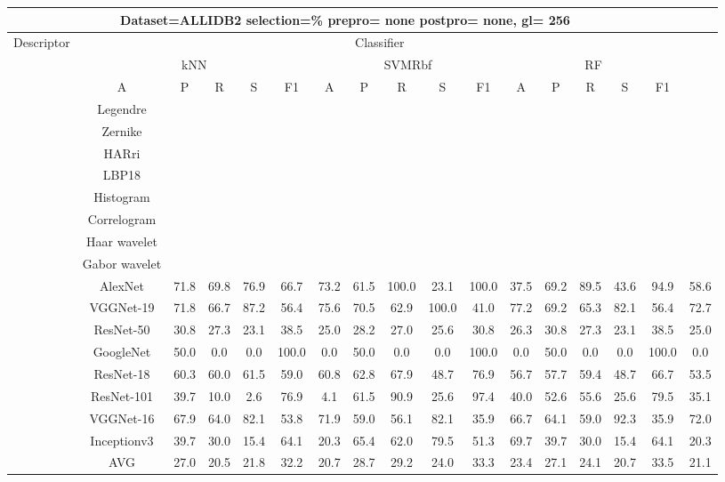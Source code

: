 \documentclass[12pt,italian]{article}
\begin{document}
\begin{tiny}
 \pagebreak 
\begin{longtable}{lcccccccccccccccc}
\toprule
\multicolumn{16}{c}{Dataset=ALLIDB2 selection=\% prepro= none postpro= none, gl= 256} \\ 
\toprule
Descriptor & \multicolumn{15}{c}{Classifier} \\ 
& \multicolumn{5}{c}{kNN} & \multicolumn{5}{c}{SVMRbf} & \multicolumn{5}{c}{RF} \\ 
& A & P & R & S & F1 & A & P & R & S & F1 & A & P & R & S & F1 \\ 
\midrule
& Legendre \\ 
& Zernike \\ 
& HARri \\ 
& LBP18 \\ 
& Histogram \\ 
& Correlogram \\ 
& Haar wavelet \\ 
& Gabor wavelet \\ 
& AlexNet & 71.8 & 69.8 & 76.9 & 66.7 & 73.2 & 61.5 & 100.0 & 23.1 & 100.0 & 37.5 & 69.2 & 89.5 & 43.6 & 94.9 & 58.6 \\ 
& VGGNet-19 & 71.8 & 66.7 & 87.2 & 56.4 & 75.6 & 70.5 & 62.9 & 100.0 & 41.0 & 77.2 & 69.2 & 65.3 & 82.1 & 56.4 & 72.7 \\ 
& ResNet-50 & 30.8 & 27.3 & 23.1 & 38.5 & 25.0 & 28.2 & 27.0 & 25.6 & 30.8 & 26.3 & 30.8 & 27.3 & 23.1 & 38.5 & 25.0 \\ 
& GoogleNet & 50.0 &  0.0 &  0.0 & 100.0 &  0.0 & 50.0 &  0.0 &  0.0 & 100.0 &  0.0 & 50.0 &  0.0 &  0.0 & 100.0 &  0.0 \\ 
& ResNet-18 & 60.3 & 60.0 & 61.5 & 59.0 & 60.8 & 62.8 & 67.9 & 48.7 & 76.9 & 56.7 & 57.7 & 59.4 & 48.7 & 66.7 & 53.5 \\ 
& ResNet-101 & 39.7 & 10.0 &  2.6 & 76.9 &  4.1 & 61.5 & 90.9 & 25.6 & 97.4 & 40.0 & 52.6 & 55.6 & 25.6 & 79.5 & 35.1 \\ 
& VGGNet-16 & 67.9 & 64.0 & 82.1 & 53.8 & 71.9 & 59.0 & 56.1 & 82.1 & 35.9 & 66.7 & 64.1 & 59.0 & 92.3 & 35.9 & 72.0 \\ 
& Inceptionv3 & 39.7 & 30.0 & 15.4 & 64.1 & 20.3 & 65.4 & 62.0 & 79.5 & 51.3 & 69.7 & 39.7 & 30.0 & 15.4 & 64.1 & 20.3 \\ 
\hline
& AVG & 27.0 & 20.5 & 21.8 & 32.2 & 20.7 & 28.7 & 29.2 & 24.0 & 33.3 & 23.4 & 27.1 & 24.1 & 20.7 & 33.5 & 21.1 \\ 
\hline
\bottomrule
\end{longtable} 

 \pagebreak 
\end{tiny} 
 
\end{document}

